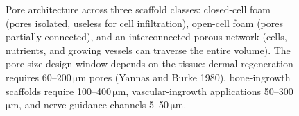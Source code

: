 \begin{figure}[htbp]
\caption{Pore architecture across three scaffold classes: closed-cell
foam (pores isolated, useless for cell infiltration), open-cell foam
(pores partially connected), and an interconnected porous network
(cells, nutrients, and growing vessels can traverse the entire
volume). The pore-size design window depends on the tissue: dermal
regeneration requires 60--200\,$\si{\micro\meter}$ pores (Yannas and
Burke 1980), bone-ingrowth scaffolds require 100--400\,$\si{\micro\meter}$,
vascular-ingrowth applications 50--300\,$\si{\micro\meter}$, and
nerve-guidance channels 5--50\,$\si{\micro\meter}$.}
\label{fig:vol06ch05:scaffold}
\end{figure}
